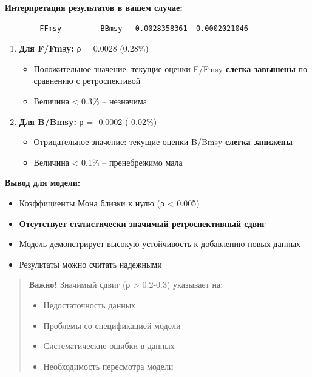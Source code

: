 \documentclass[
  letterpaper,
  DIV=11,
  numbers=noendperiod]{scrreprt}
\begin{document}
\textbf{Интерпретация результатов в вашем случае:}

\begin{verbatim}
        FFmsy         BBmsy   0.0028358361 -0.0002021046 
\end{verbatim}

\begin{enumerate}
\def\labelenumi{\arabic{enumi}.}
\item
  \textbf{Для F/Fmsy:} ρ = 0.0028 (0.28\%)

  \begin{itemize}
  \item
    Положительное значение: текущие оценки F/Fmsy \textbf{слегка
    завышены} по сравнению с ретроспективой
  \item
    Величина \textless{} 0.3\% -- незначима
  \end{itemize}
\item
  \textbf{Для B/Bmsy:} ρ = -0.0002 (-0.02\%)

  \begin{itemize}
  \item
    Отрицательное значение: текущие оценки B/Bmsy \textbf{слегка
    занижены}
  \item
    Величина \textless{} 0.1\% -- пренебрежимо мала
  \end{itemize}
\end{enumerate}

\textbf{Вывод для модели:}

\begin{itemize}
\item
  Коэффициенты Мона близки к нулю (\textbar ρ\textbar{} \textless{}
  0.005)
\item
  \textbf{Отсутствует статистически значимый ретроспективный сдвиг}
\item
  Модель демонстрирует высокую устойчивость к добавлению новых данных
\item
  Результаты можно считать надежными
\end{itemize}

\begin{quote}
\textbf{Важно!} Значимый сдвиг (\textbar ρ\textbar{} \textgreater{}
0.2-0.3) указывает на:

\begin{itemize}
\item
  Недостаточность данных
\item
  Проблемы со спецификацией модели
\item
  Систематические ошибки в данных
\item
  Необходимость пересмотра модели
\end{itemize}
\end{quote}
\end{document}
